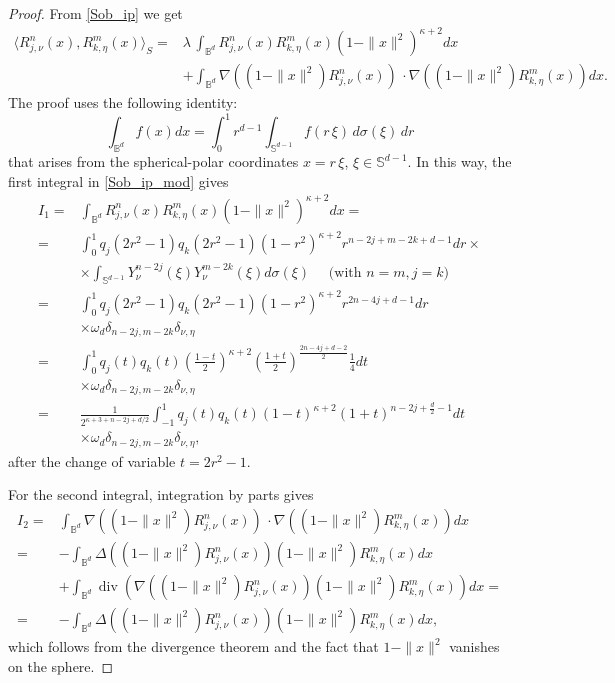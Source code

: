 \documentclass{amsart}
\theoremstyle{plain}%
\theoremstyle{definition}
\theoremstyle{remark}
\def\dive{\operatorname{div}}
\begin{document}
\begin{proof}
From \eqref{Sob_ip} we get
\begin{align}
\langle R_{j,\nu}^{n}(x),R_{k,\eta}^{m}(x)\rangle_{S} =& \lambda\, \int_{\mathbb{B}^d} R_{j,\nu}^{n}(x) R_{k,\eta}^{m}(x) (1-\|x\|^2)^{\kappa + 2} dx \nonumber \\
   &+ \int_{\mathbb{B}^d} \nabla ((1-\|x\|^2)R_{j,\nu}^{n}(x))\,\cdot \nabla ((1-\|x\|^2)R_{k,\eta}^{m}(x)) dx. \label{Sob_ip_mod}
\end{align}
The proof uses the following identity: 
\begin{equation}\label{changevar}
        \int_{\mathbb{B}^d} f(x) dx = \int_0^1 r^{d-1}\int_{\mathbb{S}^{d-1}}f(r\,\xi)\, d\sigma (\xi)\,dr
\end{equation}
that arises from the spherical-polar coordinates $x=r\,\xi$, $\xi\in \mathbb{S}^{d-1}$. In this way, the first integral in \eqref{Sob_ip_mod} gives
\begin{align*}
I_1 =& \int_{\mathbb{B}^d} R_{j,\nu}^{n}(x) R_{k,\eta}^{m}(x) (1-\|x\|^2)^{\kappa+2} dx =\\
   =& \int_{0}^1 q_{j}(2 r^2 -1) q_{k}(2 r^2 -1) (1-r^2)^{\kappa + 2} r^{n-2j+m-2k+d-1} dr \times \\
   &\times \int_{\mathbb{S}^{d-1}}  Y_\nu^{n-2j}(\xi) Y_\nu^{m-2k}(\xi) d\sigma(\xi) \quad \text{ (with } n = m, j = k) \\
=& \int_{0}^1 q_{j}(2 r^2 -1) q_{k}(2 r^2 -1) (1-r^2)^{\kappa + 2} r^{2n-4j+d-1} dr\\ 
& \times \omega_d \delta_{n-2j,m-2k} \delta_{\nu,\eta} \\
=& \int_{0}^1 q_{j}(t) q_{k}(t) \left(\frac{1-t}{2}\right)^{\kappa + 2} \left(\frac{1+t}{2}\right)^{\frac{2n-4j+d-2}{2}}\frac{1}{4} dt\\ 
& \times \omega_d \delta_{n-2j,m-2k} \delta_{\nu,\eta} \\
=& \frac{1}{2^{\kappa+3+n-2j+d/2}} \int_{-1}^1 q_{j}(t) q_{k}(t) (1-t)^{\kappa + 2} (1+t)^{n-2j+\frac{d}{2}-1} dt\\
&\times \omega_d\delta_{n-2j,m-2k} \delta_{\nu,\eta},
\end{align*}
after the change of variable \(t = 2r^2 - 1\).

For the second integral, integration by parts gives
\begin{align*}
I_2 =& \int_{\mathbb{B}^d} \nabla ((1-\|x\|^2)R_{j,\nu}^{n}(x))\,\cdot \nabla ((1-\|x\|^2)R_{k,\eta}^{m}(x)) dx \\
=& - \int_{\mathbb{B}^d} \Delta ((1-\|x\|^2)R_{j,\nu}^{n}(x))(1-\|x\|^2)R_{k,\eta}^{m}(x) dx \\
& + \int_{\mathbb{B}^d} \dive \left(\nabla((1-\|x\|^2)R_{j,\nu}^{n}(x))(1-\|x\|^2)R_{k,\eta}^{m}(x)\right) dx =\\
=& - \int_{\mathbb{B}^d} \Delta ((1-\|x\|^2)R_{j,\nu}^{n}(x))(1-\|x\|^2)R_{k,\eta}^{m}(x) dx,
\end{align*}
which follows from the divergence theorem and the fact that \(1-\|x\|^2\) vanishes on the sphere.


\end{proof}
\end{document}
